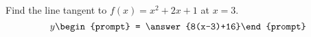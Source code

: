 \documentclass{ximera}
\author{Gregory Hartman \and Matthew Carr}
\begin{document}
\begin{exercise}




Find the line tangent to $f(x)=x^2+2x+1$ at $x=3$. 
\[
y \begin{prompt} = \answer{8(x-3)+16}\end{prompt}
\]


\end{exercise}
\end{document}
